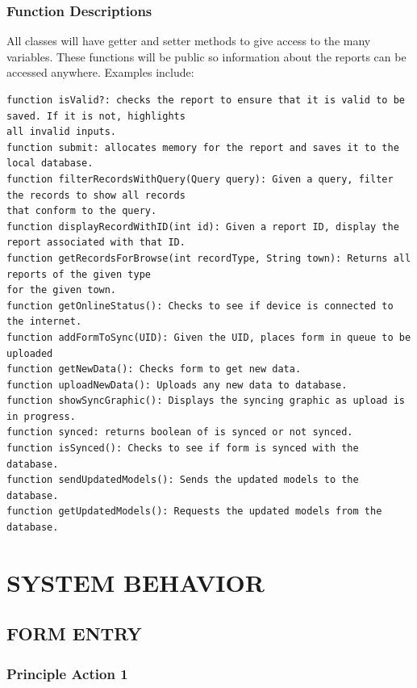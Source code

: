 \documentclass[twoside,letterpaper]{article}
\begin{document}
{\subsubsection{Function Descriptions}
All classes will have getter and setter methods to give access to the many variables. These functions will be public so information about the reports can be accessed anywhere. Examples include:
\begin{center}
\begin{verbatim}
function isValid?: checks the report to ensure that it is valid to be saved. If it is not, highlights
all invalid inputs.
function submit: allocates memory for the report and saves it to the local database.
function filterRecordsWithQuery(Query query): Given a query, filter the records to show all records
that conform to the query.
function displayRecordWithID(int id): Given a report ID, display the report associated with that ID.
function getRecordsForBrowse(int recordType, String town): Returns all reports of the given type
for the given town.
function getOnlineStatus(): Checks to see if device is connected to the internet.
function addFormToSync(UID): Given the UID, places form in queue to be uploaded
function getNewData(): Checks form to get new data.
function uploadNewData(): Uploads any new data to database.
function showSyncGraphic(): Displays the syncing graphic as upload is in progress.
function synced: returns boolean of is synced or not synced.
function isSynced(): Checks to see if form is synced with the database.
function sendUpdatedModels(): Sends the updated models to the database.
function getUpdatedModels(): Requests the updated models from the database.
\end{verbatim}
\end{center}

\clearpage\section[SYSTEM BEHAVIOR]{\rmfamily\bfseries\color{black}
SYSTEM BEHAVIOR}

\subsection[FORM ENTRY]{\rmfamily\bfseries\color{black}
FORM ENTRY}
\subsubsection{Principle Action 1}
}
\end{document}
